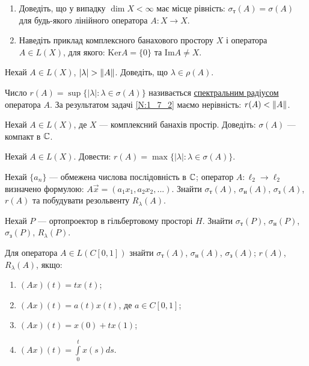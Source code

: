 \begin{exercise}
    \begin{enumerate}
        \item Доведіть, що у випадку $\dim X < \infty$ має місце рівність: 
        $\sigma_\text{т}(A) = \sigma(A)$ для будь-якого лінійного оператора 
        $A: X \rightarrow X$.
        \item Наведіть приклад комплексного банахового простору $X$ і 
        оператора $A \in L(X)$, для якого: $\mathrm{Ker} A = \{0\}$ та $\mathrm{Im} A \neq X$.
    \end{enumerate}
\end{exercise}

\begin{exercise}\label{N:1_7_2}
    Нехай $A \in L(X)$, $|\lambda| > \left\lVert A\right\rVert$. Доведіть, що $\lambda \in 
    \rho(A)$.
\end{exercise}

\begin{theory}
    Число $r(A) = \sup\{|\lambda| : \lambda \in \sigma(A)\}$ називається 
    \ul{спектральним радіусом} оператора $A$. За результатом задачі \ref{N:1_7_2} 
    маємо нерівність: $r(A) < \left\lVert A\right\rVert$.
\end{theory}

\begin{exercise}
    Нехай $A \in L(X)$, де $X$ --- комплексний банахів простір. Доведіть: 
    $\sigma(A)$ --- компакт в $\mathbb{C}$.
\end{exercise}

\begin{exercise}
    Нехай $A \in L(X)$. Довести: $r(A) = \max\{|\lambda| : \lambda \in \sigma(A)\}$.
\end{exercise}

\begin{exercise}
    Нехай $\{a_n\}$ --- обмежена числова послідовність в $\mathbb{C}$; оператор $A: \ell_2 
    \rightarrow \ell_2$ визначено формулою: $A\vec{x} = (a_1 x_1, a_2 x_2, ...)$. 
    Знайти $\sigma_\text{т}(A)$, $\sigma_\text{н}(A)$, $\sigma_\text{з}(A)$, $r(A)$ та 
    побудувати резольвенту $R_\lambda (A)$.
\end{exercise}

\begin{exercise}
    Нехай $P$ --- ортопроектор в гільбертовому просторі $H$. Знайти 
    $\sigma_\text{т}(P)$, $\sigma_\text{н}(P)$, $\sigma_\text{з}(P)$, $R_\lambda(P)$.
\end{exercise}

\begin{exercise}
    Для оператора $A \in L(C[0, 1])$ знайти 
    $\sigma_\text{т}(A)$, $\sigma_\text{н}(A)$, $\sigma_\text{з}(A)$; $r(A)$, $R_\lambda(A)$, 
    якщо:
    \begin{enumerate}
        \item $(Ax)(t) = tx(t)$;
        \item $(Ax)(t) = a(t)x(t)$, де $a \in C[0, 1]$;
        \item $(Ax)(t) = x(0) + tx(1)$;
        \item $(Ax)(t) = \int\limits_0^t x(s) ds$.
    \end{enumerate}
\end{exercise}

